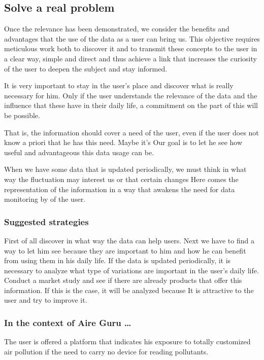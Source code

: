 \subsection{Solve a real problem}
Once the relevance has been demonstrated, we consider the benefits and advantages that the use of the data as a user can bring us.
This objective requires meticulous work both to discover it and to transmit these concepts to the user in a clear way,
simple and direct and thus achieve a link that increases the curiosity of the user to deepen the subject and
stay informed.

It is very important to stay in the user's place and discover what is really necessary for him. Only if the user understands the relevance of
the data and the influence that these have in their daily life, a commitment on the part of this will be possible.

That is, the information should cover a need of the user, even if the user does not know a priori that he has this need. Maybe it's
Our goal is to let he see how useful and advantageous this data usage can be.

When we have some data that is updated periodically, we must think in what way the fluctuation may interest us or that certain
changes Here comes the representation of the information in a way that awakens the need for data monitoring by
of the user.

\subsubsection*{Suggested strategies} 
First of all discover in what way the data can help users. Next we have to find a way to let him see
because they are important to him and how he can benefit from using them in his daily life.
If the data is updated periodically, it is necessary to analyze what type of variations are important in the user's daily life.
Conduct a market study and see if there are already products that offer this information. If this is the case, it will be analyzed because
It is attractive to the user and try to improve it.

\subsubsection*{In the context of Aire Guru \ldots} 
The user is offered a platform that indicates his exposure to totally customized air pollution if the need to carry
no device for reading pollutants.



